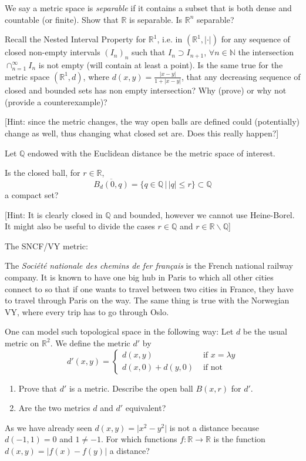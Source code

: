 \documentclass[11pt]{article}%
\newcommand{\R}{\mathbb{R}}
\newcommand{\Q}{\mathbb{Q}}
\newcommand{\N}{\mathbb{N}}
\begin{document}
\begin{Exercise}[title=*]
We say a metric space is \emph{separable} if it contains a subset that is both dense and countable (or finite). Show that $\mathbb R$ is separable. Is $\mathbb R^n$ separable?
\end{Exercise}

\begin{Exercise}[title=**]
	Recall the Nested Interval Property for $\R^1$, i.e. in $(\mathbb R^1,|\cdot|)$ for any sequence of closed non-empty intervals $(I_n)_{n}$ such that $I_n\supset I_{n+1}$, $\forall n\in\N$ the intersection $\cap_{n=1}^{\infty}I_n$ is not empty (will contain at least a point). Is the same true for the metric space $(\mathbb R^1,d)$, where $d(x,y)=\frac{|x-y|}{1+|x-y|}$, that any decreasing sequence of closed and bounded sets has non empty intersection? Why (prove) or why not (provide a counterexample)?
	
	[Hint: since the metric changes, the way open balls are defined could (potentially) change as well, thus changing what closed set are. Does this really happen?]
\end{Exercise}

\begin{Exercise}[title=**$\dagger$]
	Let $\Q$ endowed with the Euclidean distance be the metric space of interest.
	
	Is the closed ball, for $r\in\R$,
\[
\overline{B_d(0,q)}=\{q\in{\mathbb Q}\,|\,|q|\leq r\}\subset{\mathbb Q}
\]
a compact set?


[Hint: It is clearly closed in ${\mathbb Q}$ and bounded, however we cannot use Heine-Borel. It might also be useful to divide the cases $r\in\Q$ and $r\in\R\backslash\Q$]
\end{Exercise}

\begin{Exercise} [title=**]
	The SNCF/VY metric:
	 
	The \emph{ Société nationale des chemins de fer français} is the French national railway company. It is known to have one big hub in Paris to which all other cities connect to so that if one wants to travel between two cities in France, they have to travel through Paris on the way. The same thing is true with the Norwegian VY, where every trip has to go through Oslo.
	
	One can model such topological space in the following way:
	Let $d$ be the usual metric on $\mathbb{R}^2$. We define the metric $d'$ by 
	$$
	d'(x,y)=\begin{cases}d(x,y)& \text{ if } x=\lambda y\\ d(x,0)+d(y,0) &\text{ if not } \end{cases}
	$$ 
	\begin{enumerate}
		\item Prove that $d'$ is a metric. Describe the open ball $B(x,r)$ for $d'$.
		\item Are the two metrics $d$ and $d'$ equivalent?
	\end{enumerate}
\end{Exercise}

\begin{Exercise}[title=*]
	As we have already seen $d(x,y)=\lvert x^2-y^2 \rvert$ is not a distance because $d(-1,1)=0$ and $1\neq-1$. For which functions $f:\mathbb R\rightarrow\mathbb R$ is the function $d(x,y)=\lvert f(x)-f(y) \rvert$ a distance?
\end{Exercise}
\end{document}
